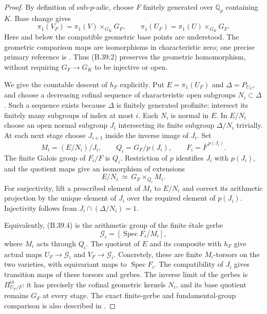 \begin{proof}
By definition of sub-$p$-adic, choose $F$ finitely
generated over $\mathbb Q_p$ containing $K$. Base
change gives
\[
 \pi_1(V_F)=\pi_1(V)\times_{G_K}G_F,
 \qquad
 \pi_1(U_F)=\pi_1(U)\times_{G_K}G_F.
 \tag{B.39.2}
\]
Here and below the compatible geometric base points
are understood. The geometric comparison maps are
isomorphisms in characteristic zero; one precise
primary reference is \cite[Theorem 1.1 and its
characteristic-zero specialization]{B_LandesmanBaseChange}.
Thus (B.39.2) preserves the geometric homomorphism,
without requiring $G_F\to G_K$ to be injective or open.

We give the countable descent of $h_F$ explicitly.
Put $E=\pi_1(U_F)$ and $\Delta=P_{U_F}$, and choose
a decreasing cofinal sequence of characteristic open
subgroups $N_i\subset\Delta$. Such a sequence exists
because $\Delta$ is finitely generated profinite:
intersect its finitely many subgroups of index at
most $i$. Each $N_i$ is normal in $E$.
In $E/N_i$ choose an open normal subgroup $J_i$
intersecting its finite subgroup $\Delta/N_i$
trivially. At each next stage choose $J_{i+1}$ inside
the inverse image of $J_i$. Set
\[
 M_i=(E/N_i)/J_i,\qquad
 Q_i=G_F/p(J_i),
 \qquad F_i=\overline F^{\,p(J_i)}.
 \tag{B.39.3}
\]
The finite Galois group of $F_i/F$ is $Q_i$.
Restriction of $p$ identifies $J_i$ with $p(J_i)$,
and the quotient maps give an isomorphism of
extensions
\[
 E/N_i\ \simeq\ G_F\times_{Q_i}M_i.
 \tag{B.39.4}
\]
For surjectivity, lift a prescribed element of $M_i$
to $E/N_i$ and correct its arithmetic projection by
the unique element of $J_i$ over the required
element of $p(J_i)$. Injectivity follows from
$J_i\cap(\Delta/N_i)=1$.

Equivalently, (B.39.4) is the arithmetic group of
the finite \'etale gerbe
\[
 \mathcal G_i=[\operatorname{Spec}F_i/M_i],
 \tag{B.39.5}
\]
where $M_i$ acts through $Q_i$. The quotient of $E$
and its composite with $h_F$ give actual maps
$U_F\to\mathcal G_i$ and $V_F\to\mathcal G_i$.
Concretely, these are finite $M_i$-torsors on the
two varieties, with equivariant maps to
$\operatorname{Spec}F_i$. The compatibility of
$J_i$ gives transition maps of these torsors and
gerbes. The inverse limit of the gerbes is
$\Pi^{\mathrm{\acute et}}_{U_F/F}$: it has precisely
the cofinal geometric kernels $N_i$, and its base
quotient remains $G_F$ at every stage. The exact
finite-gerbe and fundamental-group comparison is
also described in \cite[\S8 and Lemma 9.4]{B_BorneVistoli}.


\end{proof}
